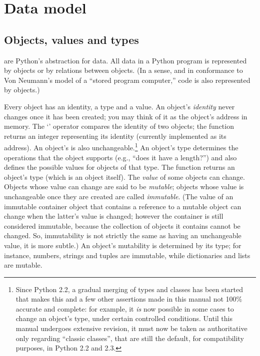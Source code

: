 \chapter{Data model\label{datamodel}}


\section{Objects, values and types\label{objects}}

 are Python's abstraction for data.  All data in a Python
program is represented by objects or by relations between objects.
(In a sense, and in conformance to Von Neumann's model of a
``stored program computer,'' code is also represented by objects.)

Every object has an identity, a type and a value.  An object's
\emph{identity} never changes once it has been created; you may think
of it as the object's address in memory.  The `' operator
compares the identity of two objects; the
 function returns an integer
representing its identity (currently implemented as its address).
An object's  is
also unchangeable.\footnote{Since Python 2.2, a gradual merging of
types and classes has been started that makes this and a few other
assertions made in this manual not 100\% accurate and complete:
for example, it \emph{is} now possible in some cases to change an
object's type, under certain controlled conditions.  Until this manual
undergoes extensive revision, it must now be taken as authoritative
only regarding ``classic classes'', that are still the default, for
compatibility purposes, in Python 2.2 and 2.3.}
An object's type determines the operations that the object
supports (e.g., ``does it have a length?'') and also defines the
possible values for objects of that type.  The
 function returns an object's type
(which is an object itself).  The \emph{value} of some
objects can change.  Objects whose value can change are said to be
\emph{mutable}; objects whose value is unchangeable once they are
created are called \emph{immutable}.
(The value of an immutable container object that contains a reference
to a mutable object can change when the latter's value is changed;
however the container is still considered immutable, because the
collection of objects it contains cannot be changed.  So, immutability
is not strictly the same as having an unchangeable value, it is more
subtle.)
An object's mutability is determined by its type; for instance,
numbers, strings and tuples are immutable, while dictionaries and
lists are mutable.

